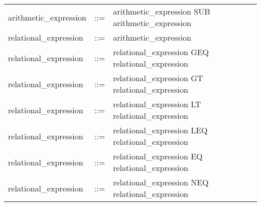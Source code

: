 \documentclass[11pt]{article}
\begin{document}
\begin{longtable}{lrl}
arithmetic\_expression                     & ::= &
  \begin{minipage}[t]{\rulerhs}
    \raggedright
    arithmetic\_expression SUB arithmetic\_expression
  \end{minipage}                                                             \\
relational\_expression                     & ::= &
  \begin{minipage}[t]{\rulerhs}
    \raggedright
    arithmetic\_expression
  \end{minipage}                                                             \\
relational\_expression                     & ::= &
  \begin{minipage}[t]{\rulerhs}
    \raggedright
    relational\_expression GEQ relational\_expression
  \end{minipage}                                                             \\
relational\_expression                     & ::= &
  \begin{minipage}[t]{\rulerhs}
    \raggedright
    relational\_expression GT relational\_expression
  \end{minipage}                                                             \\
relational\_expression                     & ::= &
  \begin{minipage}[t]{\rulerhs}
    \raggedright
    relational\_expression LT relational\_expression
  \end{minipage}                                                             \\
relational\_expression                     & ::= &
  \begin{minipage}[t]{\rulerhs}
    \raggedright
    relational\_expression LEQ relational\_expression
  \end{minipage}                                                             \\
relational\_expression                     & ::= &
  \begin{minipage}[t]{\rulerhs}
    \raggedright
    relational\_expression EQ relational\_expression
  \end{minipage}                                                             \\
relational\_expression                     & ::= &
  \begin{minipage}[t]{\rulerhs}
    \raggedright
    relational\_expression NEQ relational\_expression

\end{minipage}
\end{longtable}
\end{document}
